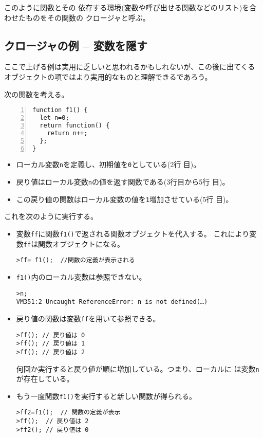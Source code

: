 このように関数とその
依存する環境(変数や呼び出せる関数などのリスト)を合わせたものをその関数の
クロージャと呼ぶ。

\subsection{クロージャの例 -- 変数を隠す}
ここで上げる例は実用に乏しいと思われるかもしれないが、この後に出てくる
オブジェクトの項ではより実用的なものと理解できるであろう。
\begin{Exec}\label{Closure1}\upshape
 次の関数を考える。
\begin{Verbatim}[numbers=left]
function f1() {
  let n=0;
  return function() {
    return n++;
  };
}
\end{Verbatim}
 \begin{itemize}\upshape
	\item ローカル変数\texttt{n}を定義し、初期値を\texttt{0}としている(2行
				目)。
	\item 戻り値はローカル変数\texttt{n}の値を返す関数である(3行目から5行
				目)。
	\item この戻り値の関数はローカル変数の値を\texttt{1}増加させている(5行
				目)。
 \end{itemize}
 これを次のように実行する。
 \begin{itemize}\upshape
	\item  変数\texttt{ff}に関数\texttt{f1()}で返される関数オブジェクトを代入する。
	これにより変数\Verb+ff+は関数オブジェクトになる。
\begin{Verbatim}
>ff= f1();  //関数の定義が表示される
\end{Verbatim}
	\item \texttt{f1()}内のローカル変数は参照できない。
\begin{Verbatim}
>n;
VM351:2 Uncaught ReferenceError: n is not defined(…)
\end{Verbatim}
	\item 戻り値の関数は変数\texttt{ff}を用いて参照できる。
\begin{Verbatim}
>ff(); // 戻り値は 0
>ff(); // 戻り値は 1
>ff(); // 戻り値は 2
\end{Verbatim}
何回か実行すると戻り値が順に増加している。つまり、ローカルに
は変数\texttt{n}が存在している。
	\item もう一度関数\texttt{f1()}を実行すると新しい関数が得られる。
\begin{Verbatim}
>ff2=f1();  // 関数の定義が表示
>ff();  // 戻り値は 2
>ff2(); // 戻り値は 0
\end{Verbatim}
 \end{itemize}
\end{Exec}
